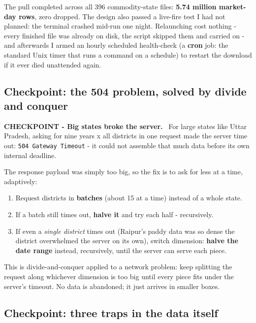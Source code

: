 \documentclass[11pt]{article}
\newenvironment{checkpoint}[1]
  {\begin{framed}\noindent\textbf{CHECKPOINT - #1.}\ }
  {\end{framed}}
\begin{document}
The pull completed across all 396 commodity-state files: \textbf{5.74 million market-day
rows}, zero dropped. The design also passed a live-fire test I had not planned: the
terminal crashed mid-run one night. Relaunching cost nothing - every finished file was
already on disk, the script skipped them and carried on - and afterwards I armed an
hourly scheduled health-check (a \textbf{cron} job: the standard Unix timer that runs a
command on a schedule) to restart the download if it ever died unattended again.

\subsection{Checkpoint: the 504 problem, solved by divide and conquer}

\begin{checkpoint}{Big states broke the server}
For large states like Uttar Pradesh, asking for nine years x all districts in one request
made the server time out: \texttt{504 Gateway Timeout} - it could not assemble that much
data before its own internal deadline.
\end{checkpoint}

The response payload was simply too big, so the fix is to ask for less at a time, adaptively:

\begin{enumerate}[leftmargin=1.8em,itemsep=1pt]
  \item Request districts in \textbf{batches} (about 15 at a time) instead of a whole state.
  \item If a batch still times out, \textbf{halve it} and try each half - recursively.
  \item If even a \emph{single district} times out (Raipur's paddy data was so dense the
        district overwhelmed the server on its own), switch dimension: \textbf{halve the
        date range} instead, recursively, until the server can serve each piece.
\end{enumerate}

This is divide-and-conquer applied to a network problem: keep splitting the request along
whichever dimension is too big until every piece fits under the server's timeout. No data
is abandoned; it just arrives in smaller boxes.

\subsection{Checkpoint: three traps in the data itself}
\end{document}
